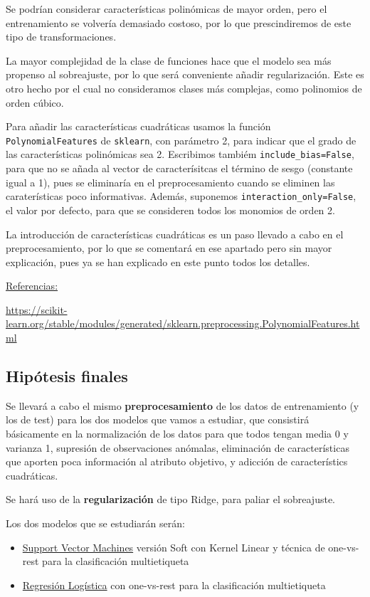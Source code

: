 \documentclass[a4]{article}
\begin{document}
Se podrían considerar características polinómicas de mayor orden, pero el entrenamiento se volvería demasiado costoso, por lo que prescindiremos de este tipo de transformaciones. 

La mayor complejidad de la clase de funciones hace que el modelo sea más propenso al sobreajuste, por lo que será conveniente añadir regularización. Este es otro hecho por el cual no consideramos clases más complejas, como polinomios de orden cúbico. 

Para añadir las características cuadráticas usamos la función \lstinline|PolynomialFeatures| de \lstinline|sklearn|, con parámetro 2, para indicar que el grado de las características polinómicas sea 2. Escribimos tambiém \lstinline|include_bias=False|, para que no se añada al vector de caracterísitcas el término de sesgo (constante igual a 1), pues se eliminaría en el preprocesamiento cuando se eliminen las caraterísticas poco informativas. Además, suponemos \lstinline|interaction_only=False|, el valor por defecto, para que se consideren todos los monomios de orden 2. 

La introducción de características cuadráticas es un paso llevado a cabo en el preprocesamiento, por lo que se comentará en ese apartado pero sin mayor explicación, pues ya se han explicado en este punto todos los detalles. 

\underline{Referencias:}

\href{https://scikit-learn.org/stable/modules/generated/sklearn.preprocessing.PolynomialFeatures.html}{https://scikit-learn.org/stable/modules/generated/sklearn.preprocessing.PolynomialFeatures.html}

\subsection{Hipótesis finales}

Se llevará a cabo el mismo \textbf{preprocesamiento} de los datos de entrenamiento (y los de test) para los dos modelos que vamos a estudiar, que consistirá básicamente en la normalización de los datos para que todos tengan media 0 y varianza 1, supresión de observaciones anómalas, eliminación de características que aporten poca información al atributo objetivo, y adicción de característics cuadráticas. 

Se hará uso de la \textbf{regularización} de tipo Ridge, para paliar el sobreajuste. 

Los dos modelos que se estudiarán serán:
\begin{itemize}
 \item \underline{Support Vector Machines} versión Soft con Kernel Linear y técnica de one-vs-rest para la clasificación multietiqueta
\item \underline{Regresión Logística} con one-vs-rest para la clasificación multietiqueta
\end{itemize}
\end{document}

